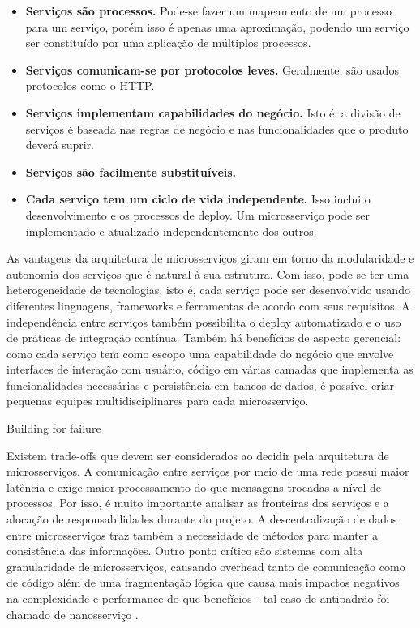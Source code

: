 \begin{itemize}
\item \textbf{Serviços são processos. }Pode-se fazer um mapeamento de um processo para um serviço, porém isso é apenas uma aproximação, podendo um serviço ser constituído por uma aplicação de múltiplos processos.
\item \textbf{Serviços comunicam-se por protocolos leves. }Geralmente, são usados protocolos como o HTTP.
\item \textbf{Serviços implementam capabilidades do negócio. }Isto é, a divisão de serviços é baseada nas regras de negócio e nas funcionalidades que o produto deverá suprir.
\item \textbf{Serviços são facilmente substituíveis.}
\item \textbf{Cada serviço tem um ciclo de vida independente. }Isso inclui o desenvolvimento e os processos de deploy. Um microsserviço pode ser implementado e atualizado independentemente dos outros.
\end{itemize}

As vantagens da arquitetura de microsserviços giram em torno da modularidade e autonomia dos serviços que é natural à sua estrutura. Com isso, pode-se ter uma heterogeneidade de tecnologias, isto é, cada serviço pode ser desenvolvido usando diferentes linguagens, frameworks e ferramentas de acordo com seus requisitos. A independência entre serviços também possibilita o deploy automatizado e o uso de práticas de integração contínua. Também há benefícios de aspecto gerencial: como cada serviço tem como escopo uma capabilidade do negócio que envolve interfaces de interação com usuário, código em várias camadas que implementa as funcionalidades necessárias e persistência em bancos de dados, é possível criar pequenas equipes multidisciplinares para cada microsserviço.

Building for failure %

Existem trade-offs que devem ser considerados ao decidir pela arquitetura de microsserviços. A comunicação entre serviços por meio de uma rede possui maior latência e exige maior processamento do que mensagens trocadas a nível de processos. Por isso, é muito importante analisar as fronteiras dos serviços e a alocação de responsabilidades durante do projeto. A descentralização de dados entre microsserviços traz também a necessidade de métodos para manter a consistência das informações. Outro ponto crítico são sistemas com alta granularidade de microsserviços, causando overhead tanto de comunicação como de código além de uma fragmentação lógica que causa mais impactos negativos na complexidade e performance do que benefícios - tal caso de antipadrão foi chamado de nanosserviço \cite{rotem}.

